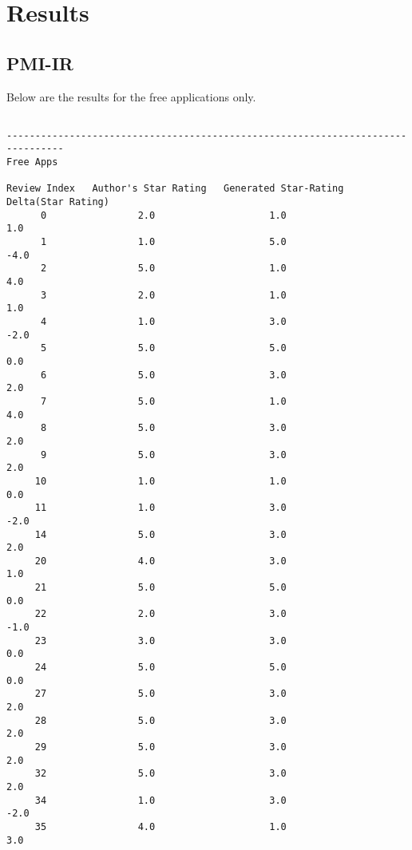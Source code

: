\documentclass[11pt]{report} %
\begin{document}


\chapter{Results}
\label{chapter:results}
	\section{PMI-IR}

Below are the results for the free applications only.

\begin{verbatim}

--------------------------------------------------------------------------------
Free Apps

Review Index   Author's Star Rating   Generated Star-Rating   Delta(Star Rating)
      0                2.0                    1.0 	                  1.0
      1                1.0                    5.0                   -4.0
      2                5.0                    1.0                    4.0
      3                2.0                    1.0                    1.0
      4                1.0                    3.0                   -2.0
      5                5.0                    5.0                    0.0
      6                5.0                    3.0                    2.0
      7                5.0                    1.0                    4.0
      8                5.0                    3.0                    2.0
      9                5.0                    3.0                    2.0
     10                1.0                    1.0                    0.0
     11                1.0                    3.0                   -2.0
     14                5.0                    3.0                    2.0
     20                4.0                    3.0                    1.0
     21                5.0                    5.0                    0.0
     22                2.0                    3.0                   -1.0
     23                3.0                    3.0                    0.0
     24                5.0                    5.0                    0.0
     27                5.0                    3.0                    2.0
     28                5.0                    3.0                    2.0
     29                5.0                    3.0                    2.0
     32                5.0                    3.0                    2.0
     34                1.0                    3.0                   -2.0
     35                4.0                    1.0                    3.0

\end{verbatim}
\end{document}
